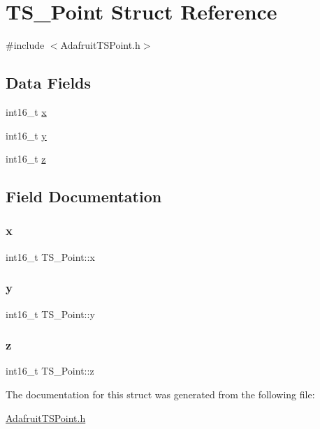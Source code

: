 \hypertarget{struct_t_s___point}{}\section{T\+S\+\_\+\+Point Struct Reference}
\label{struct_t_s___point}


{\ttfamily \#include $<$Adafruit\+T\+S\+Point.\+h$>$}

\subsection*{Data Fields}
\begin{DoxyCompactItemize}
\item 
int16\+\_\+t \mbox{\hyperlink{struct_t_s___point_aea1defb6152bf9af64f0f823c9524ba5}{x}}
\item 
int16\+\_\+t \mbox{\hyperlink{struct_t_s___point_a72927221f9227a1073019d510876a300}{y}}
\item 
int16\+\_\+t \mbox{\hyperlink{struct_t_s___point_ac17deb8383607ea69216bef2b2aac952}{z}}
\end{DoxyCompactItemize}


\subsection{Field Documentation}
\mbox{\label{struct_t_s___point_aea1defb6152bf9af64f0f823c9524ba5}} 
\subsubsection{\texorpdfstring{x}{x}}
{\footnotesize\ttfamily int16\+\_\+t T\+S\+\_\+\+Point\+::x}

\mbox{\label{struct_t_s___point_a72927221f9227a1073019d510876a300}} 
\subsubsection{\texorpdfstring{y}{y}}
{\footnotesize\ttfamily int16\+\_\+t T\+S\+\_\+\+Point\+::y}

\mbox{\label{struct_t_s___point_ac17deb8383607ea69216bef2b2aac952}} 
\subsubsection{\texorpdfstring{z}{z}}
{\footnotesize\ttfamily int16\+\_\+t T\+S\+\_\+\+Point\+::z}



The documentation for this struct was generated from the following file\+:\begin{DoxyCompactItemize}
\item 
\mbox{\hyperlink{_adafruit_t_s_point_8h}{Adafruit\+T\+S\+Point.\+h}}\end{DoxyCompactItemize}
